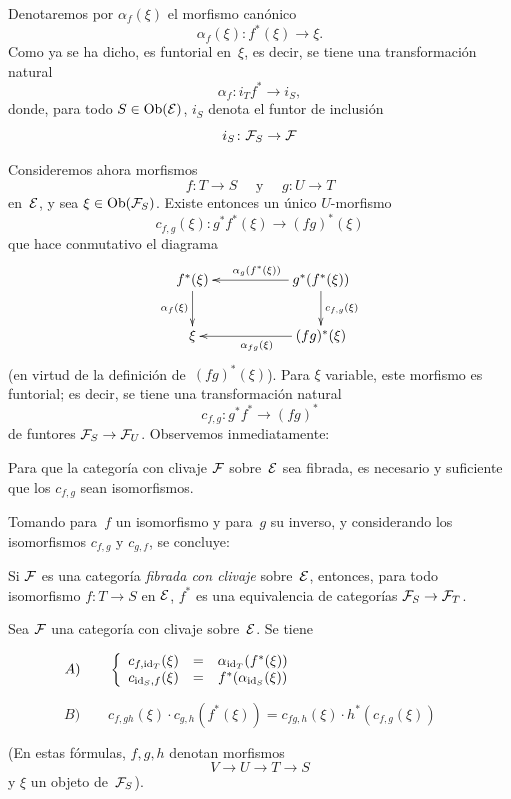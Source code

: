 Denotaremos por $\alpha_f(\xi)$ el morfismo canónico
$$
\alpha_f(\xi)\colon f^*(\xi)\to\xi.
$$
Como ya se ha dicho, es funtorial en~$\xi$, es decir, se tiene una
transformación natural
$$
\alpha_f\colon i_Tf^*\to i_S,
$$
donde, para todo $S\in\Ob(\cal{E})$, $i_S$ denota el funtor de inclusión
$$
i_S\colon\cal{F}_S\to\cal{F}
$$

Consideremos ahora morfismos
$$
f\colon T\to S\quad\text{ y }\quad g\colon U\to T
$$
en~$\cal{E}$, y sea $\xi\in\Ob(\cal{F}_S)$. Existe entonces un único
$U$-morfismo
$$
c_{f,g}(\xi)\colon g^*f^*(\xi)\to(fg)^*(\xi)
$$
que hace
conmutativo el diagrama
$$
\xymatrix{
f^*(\xi) \ar[d]_{\alpha_f(\xi)} & & \ar[ll]_{\alpha_g(f^*(\xi))}
g^*(f^*(\xi)) \ar[d]^{c_{f,g}(\xi)} \\
\xi & & \ar[ll]^{\alpha_{fg}(\xi)} (fg)^*(\xi) }
$$
(en virtud de la definición de~$(fg)^*(\xi)$). Para $\xi$ variable,
este morfismo es funtorial; es decir, se tiene una transformación natural
$$
c_{f,g}\colon g^*f^*\to(fg)^*
$$
de funtores $\cal{F}_S\to\cal{F}_U$. Observemos inmediatamente:
\begin{proposition}
\label{VI.7.2} Para que la categoría con clivaje $\cal{F}$
sobre~$\cal{E}$ sea fibrada, es necesario y suficiente que los
$c_{f,g}$ sean isomorfismos.
\end{proposition}

Tomando para~$f$ un isomorfismo y para~$g$ su inverso, y considerando los
isomorfismos $c_{f,g}$ y $c_{g,f}$, se concluye:
\begin{corollaire}
\label{VI.7.3} Si $\cal{F}$ es una categoría \emph{fibrada con clivaje}
sobre~$\cal{E}$, entonces, para todo isomorfismo $f\colon T\to S$ en
$\cal{E}$, $f^*$ es una equivalencia de categorías
$\cal{F}_S\to\cal{F}_T$.
\end{corollaire}

\begin{proposition}
\label{VI.7.4} Sea $\cal{F}$ una categoría con clivaje sobre~$\cal{E}$.
Se tiene

$\qquad\qquad A)\qquad
\left\{\begin{array}{ccc}c_{f,\id_T}(\xi)&=&\alpha_{\id_T}(f^*(\xi))\\
c_{\id_S,f}(\xi)&=&f^*(\alpha_{\id_S}(\xi))
\end{array}\right.$

\smallskip
$\qquad\qquad B)\qquad c_{f,gh}(\xi)\cdot
c_{g,h}(f^*(\xi))=c_{fg,h}(\xi)\cdot h^*(c_{f,g}(\xi))$

\noindent(En
estas fórmulas, $f,g,h$ denotan morfismos
$$
V\to U\to T\to S
$$
y $\xi$ un objeto de~$\cal{F}_S$).
\end{proposition}

